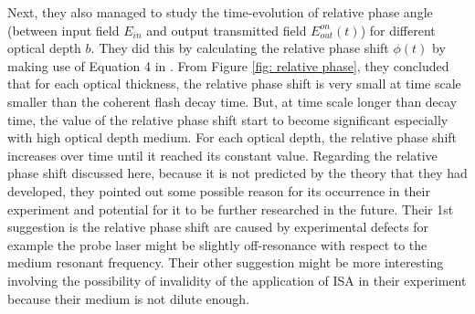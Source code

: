 Next, they also managed to study the time-evolution of relative phase angle (between input field $E_{in}$ and output transmitted field $E_{out}^{on}(t)$) for different optical depth $b$. They did this by calculating the relative phase shift $\phi(t)$ by making use of Equation 4 in \cite{Chalony2011}. From Figure \ref{fig: relative phase}, they concluded that for each optical thickness, the relative phase shift is very small at time scale smaller than the coherent flash decay time. But, at time scale longer than decay time, the value of the relative phase shift start to become significant especially with high optical depth medium. For each optical depth, the relative phase shift increases over time until it reached its constant value. Regarding the relative phase shift discussed here, because it is not predicted by the theory that they had developed, they pointed out some possible reason for its occurrence in their experiment and potential for it to be further researched in the future. Their 1st suggestion is the relative phase shift are caused by experimental defects for example the probe laser might be slightly off-resonance with respect to the medium resonant frequency. Their other suggestion might be more interesting involving the possibility of invalidity of the application of ISA in their experiment because their medium is not dilute enough.\\

